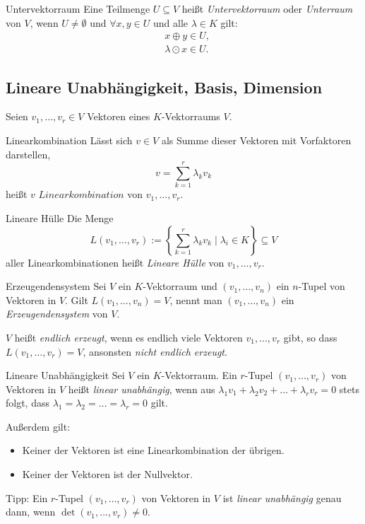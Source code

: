 \documentclass[german]{spicker}
\begin{document}
\begin{defi}{Untervektorraum}
    Eine Teilmenge $U \subseteq V$ heißt \emph{Untervektorraum} oder \emph{Unterraum} von $V$, wenn $U \neq \emptyset$ und $\forall x, y \in U$ und alle $\lambda \in K$ gilt:
    $$
        \begin{aligned}
             & x \oplus y \in U,      \\
             & \lambda \odot x \in U.
        \end{aligned}
    $$
\end{defi}

\newpage
\subsection{Lineare Unabhängigkeit, Basis, Dimension}

Seien $v_1, \ldots, v_r \in V$ Vektoren eines $K$-Vektorraums $V$.

\begin{defi}{Linearkombination}
    Lässt sich $v\in V$ als Summe dieser Vektoren mit Vorfaktoren darstellen,
    $$
        v = \sum^r_{k=1} \lambda_kv_k
    $$
    heißt $v$ $Linearkombination$ von $v_1, \ldots, v_r$.
\end{defi}

\begin{defi}{Lineare Hülle}
    Die Menge
    $$
        L(v_1, \ldots, v_r) := \left\{ \sum^r_{k=1} \lambda_kv_k \mid \lambda_i \in K \right\} \subseteq V
    $$
    aller Linearkombinationen heißt \emph{Lineare Hülle} von $v_1, \ldots, v_r$.
\end{defi}

\begin{defi}{Erzeugendensystem}
    Sei $V$ ein $K$-Vektorraum und $(v_1, \ldots, v_n)$ ein $n$-Tupel von Vektoren in $V$.
    Gilt $L(v_1, \ldots, v_n) = V$, nennt man $(v_1, \ldots, v_n)$ ein \emph{Erzeugendensystem} von $V$.

    $V$ heißt \emph{endlich erzeugt}, wenn es endlich viele Vektoren $v_1, \ldots, v_r$ gibt, so dass  $L(v_1, \ldots, v_r) = V$, ansonsten \emph{nicht endlich erzeugt}.
\end{defi}

\begin{defi}{Lineare Unabhängigkeit}
    Sei $V$ ein $K$-Vektorraum. Ein $r$-Tupel $(v_1, \ldots, v_r)$ von Vektoren in $V$ heißt \emph{linear unabhängig}, wenn aus $\lambda_1v_1 +\lambda_2v_2 + \ldots + \lambda_rv_r = 0$ stets folgt, dass $\lambda_1 = \lambda_2 = \ldots = \lambda_r = 0$ gilt.

    Außerdem gilt:
    \begin{itemize}
        \item Keiner der Vektoren ist eine Linearkombination der übrigen.
        \item Keiner der Vektoren ist der Nullvektor.
    \end{itemize}

    Tipp: Ein $r$-Tupel $(v_1, \ldots, v_r)$ von Vektoren in $V$ ist \emph{linear unabhängig} genau dann, wenn $\det(v_1, \ldots, v_r) \neq 0$.
\end{defi}
\end{document}
